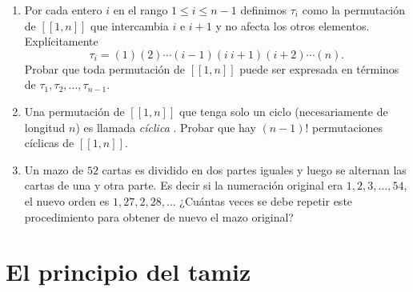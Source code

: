 \begin{enumerate}
\item Por cada entero $i$ en el rango $1 \le i \le n-1$ definimos $\tau_i$ como la permutación de $[[1,n]]$ que intercambia $i$ e $i+1$ y no afecta los otros elementos. Explícitamente 
$$
\tau_i = (1)(2)\cdots(i-1)(i\ i+1)(i+2)\cdots(n).
$$
Probar que toda permutación de $[[1,n]]$ puede ser expresada en términos de $\tau_1,\tau_2,\ldots,\tau_{n-1}$. 

\item Una permutación de $[[1,n]]$ que tenga solo un ciclo (necesariamente de longitud $n$) es llamada \textit{cíclica}  . Probar que hay $(n-1)!$ permutaciones cíclicas de $[[1,n]]$.

\item Un mazo de $52$ cartas es dividido en dos partes iguales y luego se alternan las cartas de una y otra parte. Es decir si la numeración original era $1,2,3,\ldots,54$, el nuevo orden es $1,27,2,28,\ldots$ ¿Cuántas veces se debe repetir este procedimiento para obtener de nuevo el mazo original? 
\end{enumerate}


\chapter[El principio del tamiz]{El principio del tamiz} \label{ape.principio_del_tamiz}

